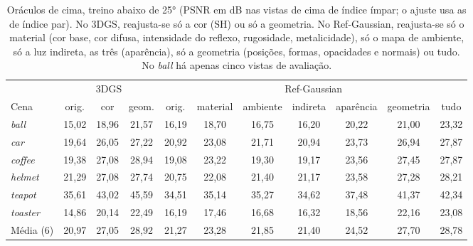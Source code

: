 \begin{table}[t]
\centering
\caption{Oráculos de cima, treino abaixo de 25° (PSNR em dB nas vistas de cima de índice ímpar; o ajuste usa as de índice par). No 3DGS, reajusta-se só a cor (SH) ou só a geometria. No Ref-Gaussian, reajusta-se só o material (cor base, cor difusa, intensidade do reflexo, rugosidade, metalicidade), só o mapa de ambiente, só a luz indireta, as três (aparência), só a geometria (posições, formas, opacidades e normais) ou tudo. No \textit{ball} há apenas cinco vistas de avaliação.}
\label{tab:refgsoraculos25}
\setlength{\tabcolsep}{4pt}
\footnotesize
\begin{tabular}{l ccc ccccccc}
\toprule
 & \multicolumn{3}{c}{3DGS} & \multicolumn{7}{c}{Ref-Gaussian} \\
\cmidrule(lr){2-4}\cmidrule(lr){5-11}
Cena & orig. & cor & geom. & orig. & material & ambiente & indireta & aparência & geometria & tudo \\
\midrule
\textit{ball} & 15{,}02 & 18{,}96 & 21{,}57 & 16{,}19 & 18{,}70 & 16{,}75 & 16{,}20 & 20{,}22 & 21{,}00 & 23{,}32 \\
\textit{car} & 19{,}64 & 26{,}05 & 27{,}22 & 20{,}92 & 23{,}08 & 21{,}71 & 20{,}94 & 23{,}73 & 26{,}94 & 27{,}87 \\
\textit{coffee} & 19{,}38 & 27{,}08 & 28{,}94 & 19{,}08 & 23{,}22 & 19{,}30 & 19{,}17 & 23{,}56 & 27{,}45 & 27{,}87 \\
\textit{helmet} & 21{,}29 & 27{,}08 & 27{,}74 & 20{,}75 & 22{,}08 & 21{,}40 & 21{,}17 & 23{,}58 & 27{,}28 & 28{,}21 \\
\textit{teapot} & 35{,}61 & 43{,}02 & 45{,}59 & 34{,}51 & 35{,}14 & 35{,}27 & 34{,}62 & 37{,}48 & 41{,}37 & 42{,}34 \\
\textit{toaster} & 14{,}86 & 20{,}14 & 22{,}49 & 16{,}19 & 17{,}46 & 16{,}68 & 16{,}32 & 18{,}56 & 22{,}16 & 23{,}08 \\
\midrule
Média (6) & 20{,}97 & 27{,}05 & 28{,}92 & 21{,}27 & 23{,}28 & 21{,}85 & 21{,}40 & 24{,}52 & 27{,}70 & 28{,}78 \\
\bottomrule
\end{tabular}
\end{table}
